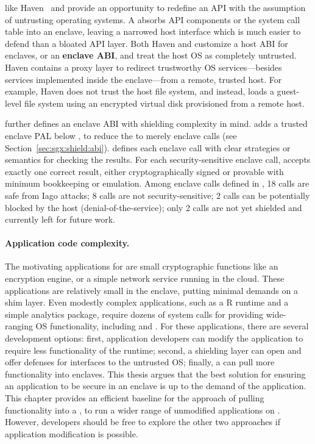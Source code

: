 \Liboses{} like Haven~\cite{baumann14haven} and \graphenesgx{} provide an opportunity to redefine an API
with the assumption of untrusting operating systems.
A \libos{} absorbs API components or the system call table into an enclave,
leaving a narrowed host interface
which is much easier to defend than a bloated API layer.
Both Haven and \graphenesgx{} customize
a host ABI for enclaves, or an {\bf enclave ABI}, and treat the host OS as completely untrusted.
Haven contains a proxy layer to redirect trustworthy OS services---besides services implemented inside the enclave---from a remote, trusted host.
For example, Haven does not trust the host file system,
and instead, loads a guest-level file system
using an encrypted virtual disk provisioned from a remote host.


\graphenesgx{} further defines an enclave ABI with shielding complexity in mind.
\graphenesgx{} adds a trusted enclave PAL below
\thehostabi{}, to reduce the \palcallnum{} \hostapis{} to merely \enclavecallnum{} enclave calls (see Section~\ref{sec:sgx:shield:abi}).
\graphenesgx{} defines each enclave call with clear strategies or semantics for checking the results.
For each security-sensitive enclave call, \graphenesgx{} accepts exactly one correct result, either cryptographically signed or provable with minimum bookkeeping or emulation. 
Among \enclavecallnum{} enclave calls defined in \graphenesgx{}, 18 calls are safe from Iago attacks; 8 calls are not security-sensitive; 2 calls can be potentially blocked by the host (denial-of-the-service); only 2 calls are not yet shielded and currently left for future work.







\paragraph{Application code complexity.}
The motivating applications for \sgx{}
are small cryptographic functions like an encryption engine,
or a simple network service running in the cloud.
These applications are relatively small
in the enclave,
putting minimal demands on a shim layer. 
Even modestly complex applications, such as a R runtime and a simple analytics package, require dozens of system calls for providing wide-ranging OS functionality, 
including  and .
For these applications, there are several development options:
first, application developers can modify the application
to require less functionality of the runtime;
second, a shielding layer can open and offer defenses for 
interfaces to the untrusted OS; finally, a \libos{} can pull more functionality into enclaves.
This thesis argues that the best solution for ensuring an application to be secure in an enclave
is up to the demand of the application.
This chapter provides an efficient baseline for the approach of pulling functionality into a \libos{},
to run a wider range of unmodified applications
on \sgx{}. However, developers should be free to explore the other two approaches if application modification is possible. 



